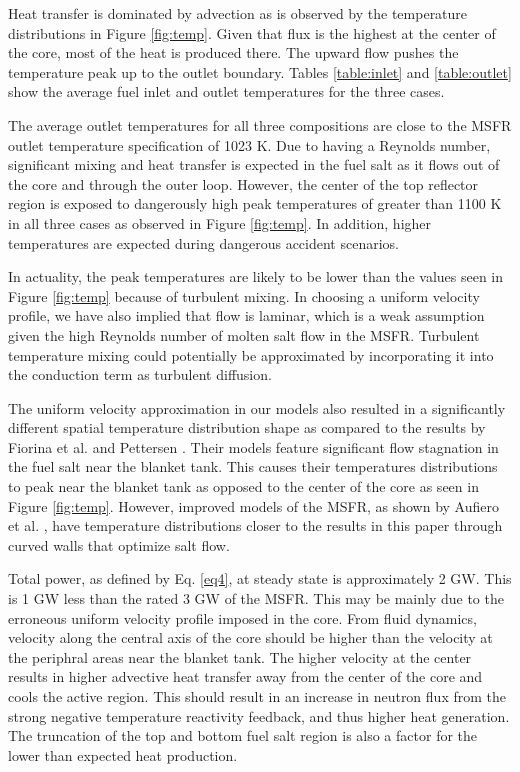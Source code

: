 \documentclass{anstrans}
\begin{document}
	Heat transfer is dominated by advection as is observed by the temperature
	distributions in Figure \ref{fig:temp}. Given that flux is the highest
	at the center of the core, most of the heat is produced there. The upward
	flow pushes the temperature peak up to the outlet boundary. Tables
	\ref{table:inlet} and \ref{table:outlet} show the average
	fuel inlet and outlet temperatures for the three cases.

	The average outlet temperatures for all three compositions are close to
	the \gls{MSFR} outlet temperature specification of 1023 K. Due to having a
	Reynolds number, significant
	mixing and heat transfer is expected in the fuel salt as it flows
	out of the core and through the outer loop. However, the center of the top
	reflector region is exposed to dangerously high peak temperatures
	of greater than 1100 K in all three cases as observed in Figure
	\ref{fig:temp}. In addition, higher temperatures
	are expected during dangerous accident scenarios.
	
	In actuality, the peak temperatures are likely to be lower than the values
	seen in Figure \ref{fig:temp} because of turbulent mixing. In choosing a
	uniform velocity profile, we have also implied that flow is laminar, which
	is a weak assumption given the high Reynolds number of molten salt flow in
	the \gls{MSFR}. Turbulent temperature mixing could potentially be
	approximated by
	incorporating it into the conduction term as turbulent diffusion.
	
	The uniform velocity approximation in our models also resulted in a
	significantly different spatial temperature distribution shape as compared
	to
	the results by Fiorina et al. \cite{fiorina_modelling_2014} and Pettersen
	\cite{pettersen_coupled_2016}. Their models feature significant flow
	stagnation in the fuel salt
	near the blanket tank. This causes their temperatures distributions to peak
	near the blanket
	tank as opposed to the center of the core as seen in Figure \ref{fig:temp}.
	However, improved models of the \gls{MSFR}, as shown by Aufiero et al.
	\cite{aufiero_development_2014}, have temperature distributions closer to
	the results in this paper through curved walls that optimize salt flow.
	
	Total power, as defined by Eq. \ref{eq4}, at steady state is approximately
	2 GW. This
	is 1 GW less than the rated 3 GW of the \gls{MSFR}. This may be mainly due
	to the erroneous uniform velocity profile imposed in the core. From
	fluid dynamics, velocity along the central axis of the core should be
	higher than the velocity at the periphral areas near the blanket tank.
	The higher velocity at the center results in higher advective heat transfer
	away from the center of the core and cools the active region. This should
	result in an increase in neutron flux from the strong negative
	temperature reactivity feedback, and thus higher heat generation. The
	truncation of the top and bottom fuel salt region is also a factor for
	the lower than expected heat production.
	
\end{document}
